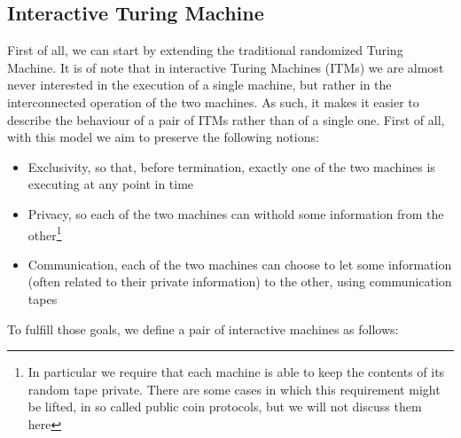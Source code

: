 \documentclass{article}
\begin{document}
\subsection{Interactive Turing Machine}
First of all, we can start by extending the traditional randomized Turing Machine. It is of note that in interactive Turing Machines (ITMs) we are almost never interested in the execution of a single machine, but rather in the interconnected operation of the two machines. As such, it makes it easier to describe the behaviour of a pair of ITMs rather than of a single one. First of all, with this model we aim to preserve the following notions:
\begin{itemize}
    \item Exclusivity, so that, before termination, exactly one of the two machines is executing at any point in time
    \item Privacy, so each of the two machines can withold some information from the other\footnote{In particular we require that each machine is able to keep the contents of its random tape private. There are some cases in which this requirement might be lifted, in so called public coin protocols, but we will not discuss them here}
    \item Communication, each of the two machines can choose to let some information (often related to their private information) to the other, using communication tapes
\end{itemize}
To fulfill those goals, we define a pair of interactive machines as follows:
\end{document}
